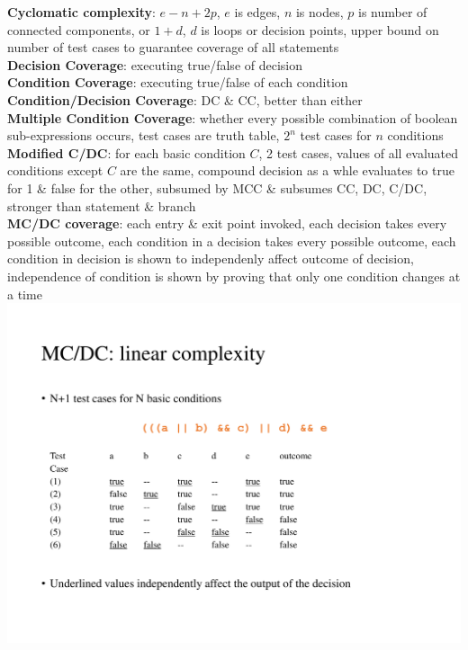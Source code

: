 \documentclass[a4paper]{article}
\begin{document}
\begin{multicols}{3}
        \textbf{Cyclomatic complexity}: $e-n+2p$, $e$ is edges, $n$ is nodes, $p$ is number of connected components, or $1+d$, $d$ is loops or decision points, upper bound on number of test cases to guarantee coverage of all statements\\
        \textbf{Decision Coverage}: executing true/false of decision\\
        \textbf{Condition Coverage}: executing true/false of each condition\\
        \textbf{Condition/Decision Coverage}: DC \& CC, better than either\\
        \textbf{Multiple Condition Coverage}: whether every possible combination of boolean sub-expressions occurs, test cases are truth table, $2^n$ test cases for $n$ conditions\\
        \textbf{Modified C/DC}: for each basic condition $C$, 2 test cases, values of all evaluated conditions except $C$ are the same, compound decision as a whle evaluates to true for 1 \& false for the other, subsumed by MCC \& subsumes CC, DC, C/DC, stronger than statement \& branch\\
        \textbf{MC/DC coverage}: each entry \& exit point invoked, each decision takes every possible outcome, each condition in a decision takes every possible outcome, each condition in decision is shown to independenly affect outcome of decision, independence of condition is shown by proving that only one condition changes at a time\\
        \includegraphics[width=\linewidth]{148.pdf}\\

\end{multicols}
\end{document}

